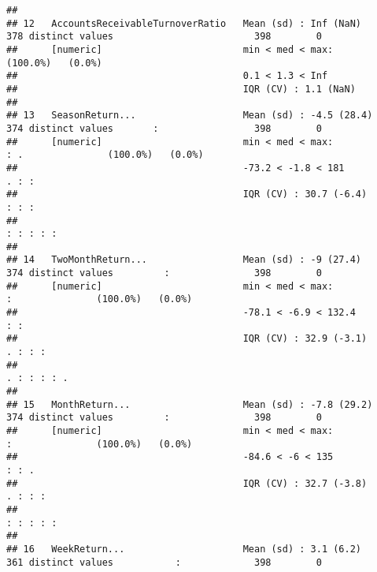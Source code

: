 \documentclass[
]{article}
\begin{document}
\begin{verbatim}
## 
## 12   AccountsReceivableTurnoverRatio   Mean (sd) : Inf (NaN)     378 distinct values                         398        0        
##      [numeric]                         min < med < max:                                                      (100.0%)   (0.0%)   
##                                        0.1 < 1.3 < Inf                                                                           
##                                        IQR (CV) : 1.1 (NaN)                                                                      
## 
## 13   SeasonReturn...                   Mean (sd) : -4.5 (28.4)   374 distinct values       :                 398        0        
##      [numeric]                         min < med < max:                                    : .               (100.0%)   (0.0%)   
##                                        -73.2 < -1.8 < 181                                . : :                                   
##                                        IQR (CV) : 30.7 (-6.4)                            : : :                                   
##                                                                                        : : : : :                                 
## 
## 14   TwoMonthReturn...                 Mean (sd) : -9 (27.4)     374 distinct values         :               398        0        
##      [numeric]                         min < med < max:                                      :               (100.0%)   (0.0%)   
##                                        -78.1 < -6.9 < 132.4                                : :                                   
##                                        IQR (CV) : 32.9 (-3.1)                            . : : :                                 
##                                                                                        . : : : : .                               
## 
## 15   MonthReturn...                    Mean (sd) : -7.8 (29.2)   374 distinct values         :               398        0        
##      [numeric]                         min < med < max:                                      :               (100.0%)   (0.0%)   
##                                        -84.6 < -6 < 135                                    : : .                                 
##                                        IQR (CV) : 32.7 (-3.8)                            . : : :                                 
##                                                                                          : : : : :                               
## 
## 16   WeekReturn...                     Mean (sd) : 3.1 (6.2)     361 distinct values           :             398        0        

\end{verbatim}
\end{document}
